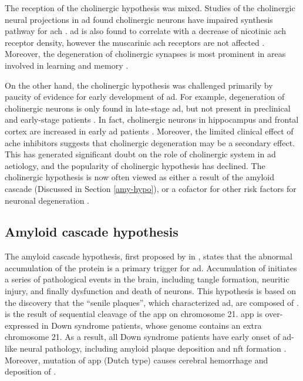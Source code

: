 The reception of the cholinergic hypothesis was mixed. Studies of the cholinergic neural projections in \gls{ad} found cholinergic neurons have impaired synthesis pathway for \gls{ach} \citep{milner87}. \gls{ad} is also found to correlate with a decrease of nicotinic \gls{ach} receptor density, however the muscarinic \gls{ach} receptors are not affected \citep{nordberg92, burghaus00}. Moreover, the degeneration of cholinergic synapses is most prominent in areas involved in learning and memory \citep{geula96}. 

On the other hand, the cholinergic hypothesis was challenged primarily by paucity of evidence for early development of \gls{ad}. For example, degeneration of cholinergic neurons is only found in late-stage \gls{ad}, but not present in preclinical and early-stage patients \citep{davis99}. In fact, cholinergic neurons in hippocampus and frontal cortex are increased in early \gls{ad} patients \citep{dekosky02}. Moreover, the limited clinical effect of \gls{ache} inhibitors suggests that cholinergic degeneration may be a secondary effect. This has generated significant doubt on the role of cholinergic system in \gls{ad} aetiology, and the popularity of cholinergic hypothesis has declined. The cholinergic hypothesis is now often viewed as either a result of the amyloid cascade (Discussed in Section \ref{amy-hypo}), or a cofactor for other risk factors for neuronal degeneration \citep{roberson97, contestabile11}.

\subsection{Amyloid cascade hypothesis\label{amy-hypo}}
The amyloid cascade hypothesis, first proposed by \citeauthor{hardy92} in \citeyear{hardy92}, states that the abnormal accumulation of the protein \abeta{} is a primary trigger for \gls{ad}. Accumulation of \abeta{} initiates a series of pathological events in the brain, including tangle formation, neuritic injury, and finally dysfunction and death of neurons. This hypothesis is based on the discovery that the ``senile plaques'', which characterized \gls{ad}, are composed of \abeta{} \citep{masters85}. \abeta{} is the result of sequential cleavage of the \gls{app} on chromosome 21. \Gls{app} is over-expressed in Down syndrome patients, whose genome contains an extra chromosome 21. As a result, all Down syndrome patients have early onset of \gls{ad}-like neural pathology, including amyloid plaque deposition and \gls{nft} formation \citep{wisniewski85, hardy02}. Moreover, mutation of \gls{app} (Dutch type) causes cerebral hemorrhage and deposition of \abeta{} \citep{hardy02}.

